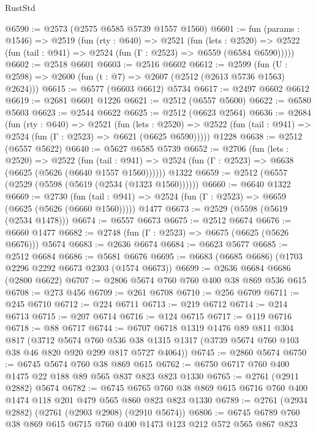 \begin{lexlean}{RustStd}
\begin{coremodule}
@6590 := @2573 (@2575 @6585 @5739 @1557 @1560)
@6601 := fun (params : @1546) =>
  @2519
    (fun (rty : @640) =>
    @2521
      (fun (lets : @2520) =>
      @2522 (fun (tail : @941) => @2524 (fun (Γ : @2523) => @6559 (@6584 @6590)))))
@6602 := @2518 @6601
@6603 := @2516 @6602
@6612 := @2599 (fun (U : @2598) => @2600 (fun (t : @7) => @2607 (@2512 (@2613 @5736 @1563) @2624)))
@6615 := @6577 (@6603 @6612) @5734
@6617 := @2497 @6602 @6612
@6619 := @2681 @6601 @1226
@6621 := @2512 (@6557 @5600)
@6622 := @6580 @5603
@6623 := @2544 @6622
@6625 := @2512 (@6623 @2564)
@6636 := @2684
    (fun (rty : @640) =>
    @2521
      (fun (lets : @2520) =>
      @2522 (fun (tail : @941) => @2524 (fun (Γ : @2523) => @6621 (@6625 @6590)))))
    @1228
@6638 := @2512 (@6557 @5622)
@6640 := @5627 @6585 @5739
@6652 := @2706
    (fun (lets : @2520) =>
    @2522
      (fun (tail : @941) => @2524 (fun (Γ : @2523) => @6638 (@6625 (@5626 (@6640 @1557 @1560))))))
    @1322
@6659 := @2512 (@6557 (@2529 (@5598 (@5619 (@2534 (@1323 @1560))))))
@6660 := @6640 @1322
@6669 := @2730
    (fun (tail : @941) => @2524 (fun (Γ : @2523) => @6659 (@6625 (@5626 (@6660 @1560)))))
    @1477
@6673 := @2529 (@5598 (@5619 (@2534 @1478)))
@6674 := @6557 @6673
@6675 := @2512 @6674
@6676 := @6660 @1477
@6682 := @2748 (fun (Γ : @2523) => @6675 (@6625 (@5626 @6676))) @5674
@6683 := @2636 @6674
@6684 := @6623 @5677
@6685 := @2512 @6684
@6686 := @5681 @6676
@6695 := @6683 (@6685 @6686) (@1703 @2296 @2292 @6673 @2303 (@1574 @6673))
@6699 := @2636 @6684 @6686 (@2800 @6622)
@6707 := @2806 @5674 @760 @760 @400 @38 @869 @536 @615
@6708 := @273 @456
@6709 := @261 @6708
@6710 := @256 @6709
@6711 := @245 @6710
@6712 := @224 @6711
@6713 := @219 @6712
@6714 := @214 @6713
@6715 := @207 @6714
@6716 := @124 @6715
@6717 := @119 @6716
@6718 := @88 @6717
@6744 := @6707
    @6718
    @1319
    @1476
    @89
    @811
    @304
    @817
    (@3712
      @5674
      @760
      @536
      @38
      @1315
      @1317
      (@3739 @5674 @760 @103 @38 @46 @820 @920 @299 @817 @5727 @4064))
@6745 := @2860 @5674
@6750 := @6745 @5674 @760 @38 @869 @615
@6762 := @6750 @6717 @760 @400 @1475 @22 @188 @89 @565 @837 @823 @823 @1330
@6765 := @2761 (@2911 @2882) @5674
@6782 := @6745
    @6765
    @760
    @38
    @869
    @615
    @6716
    @760
    @400
    @1474
    @118
    @201
    @479
    @565
    @860
    @823
    @823
    @1330
@6789 := @2761 (@2934 @2882) (@2761 (@2903 @2908) (@2910 @5674))
@6806 := @6745
    @6789
    @760
    @38
    @869
    @615
    @6715
    @760
    @400
    @1473
    @123
    @212
    @572
    @565
    @867
    @823

\end{coremodule}
\end{lexlean}
